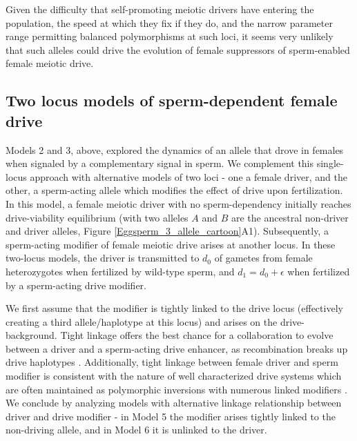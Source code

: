 \documentclass[12pt,letterpaper]{article}
\begin{document}
Given the difficulty that self-promoting meiotic drivers have entering the population, the speed at
which they fix if they do, and the narrow parameter range permitting balanced polymorphisms at such loci,  
it seems very unlikely that such alleles could drive the evolution of female suppressors of sperm-enabled
female meiotic drive. \newline 




\subsection*{Two locus models of sperm-dependent female drive}





Models 2 and 3, above, explored the dynamics of an allele that drove in females when signaled by a complementary signal in sperm.   
We complement this single-locus approach %
	with alternative models of two loci - one a female driver, 
	and the other, a sperm-acting allele which modifies the effect of drive upon fertilization. 
In this model, a female meiotic driver with no sperm-dependency 
	initially reaches drive-viability equilibrium (with two alleles
	$A$ and $B$ are the ancestral non-driver and driver alleles, Figure \ref{Eggsperm_3_allele_cartoon}A1). 
Subsequently, a sperm-acting modifier of female meiotic drive arises at another locus.  
In these two-locus models, the driver is transmitted to $d_0$ of gametes from female heterozygotes when fertilized by wild-type sperm, and $d_1=d_0+\epsilon$ when fertilized by a sperm-acting drive modifier. \newline 

We first assume that the modifier is tightly
        linked to the drive locus (effectively creating a third
        allele/haplotype at this locus) and arises on the drive-background. 
Tight linkage offers the best
        chance for a collaboration to evolve between a driver and
       a sperm-acting drive  enhancer, as recombination breaks up drive haplotypes \citep{Thomson1974,Charlesworth1978,Haig1991}. 
Additionally, tight linkage between female driver and sperm modifier is consistent with the nature of well characterized drive systems which are often maintained as polymorphic inversions with numerous linked modifiers \cite{Burt2006}. 
We conclude by analyzing models with alternative linkage relationship between driver and drive modifier - 
	in Model 5 the modifier arises tightly linked to the non-driving allele, 
	and in Model 6 it is unlinked to the driver. \newline 
\end{document}
